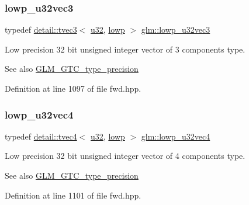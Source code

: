\subsubsection{\texorpdfstring{lowp\+\_\+u32vec3}{lowp\_u32vec3}}
{\footnotesize\ttfamily typedef \hyperlink{structglm_1_1detail_1_1tvec3}{detail\+::tvec3}$<$ \hyperlink{group__gtc__type__precision_ga54e837745059fd29017bed71cfa0a8db}{u32}, \hyperlink{namespaceglm_a0f04f086094c747d227af4425893f545ae161af3fc695e696ce3bf69f7332bc2d}{lowp} $>$ \hyperlink{group__gtc__type__precision_ga53b6133cd2491fce1445c1744556b1bb}{glm\+::lowp\+\_\+u32vec3}}

Low precision 32 bit unsigned integer vector of 3 components type. \begin{DoxySeeAlso}{See also}
\hyperlink{group__gtc__type__precision}{G\+L\+M\+\_\+\+G\+T\+C\+\_\+type\+\_\+precision} 
\end{DoxySeeAlso}


Definition at line 1097 of file fwd.\+hpp.

\mbox{\label{group__gtc__type__precision_gaad6408408c9c5321cb6ee54f201de578}} 
\subsubsection{\texorpdfstring{lowp\+\_\+u32vec4}{lowp\_u32vec4}}
{\footnotesize\ttfamily typedef \hyperlink{structglm_1_1detail_1_1tvec4}{detail\+::tvec4}$<$ \hyperlink{group__gtc__type__precision_ga54e837745059fd29017bed71cfa0a8db}{u32}, \hyperlink{namespaceglm_a0f04f086094c747d227af4425893f545ae161af3fc695e696ce3bf69f7332bc2d}{lowp} $>$ \hyperlink{group__gtc__type__precision_gaad6408408c9c5321cb6ee54f201de578}{glm\+::lowp\+\_\+u32vec4}}

Low precision 32 bit unsigned integer vector of 4 components type. \begin{DoxySeeAlso}{See also}
\hyperlink{group__gtc__type__precision}{G\+L\+M\+\_\+\+G\+T\+C\+\_\+type\+\_\+precision} 
\end{DoxySeeAlso}


Definition at line 1101 of file fwd.\+hpp.

\mbox{\label{group__gtc__type__precision_ga61ed4c68a4cffb77cd63cc107119123a}} 
